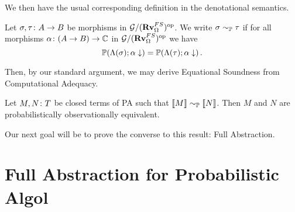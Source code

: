 \documentclass{report}[11pt]
\begin{document}
We then have the usual corresponding definition in the denotational semantics.

\begin{definition}
  Let $\sigma,\tau\colon A \to B$ be morphisms in $\mathcal G/({\normalfont\textbf{Rv}}_\Omega^{FS})^{\mathrm{op}}$.  
  We write $\sigma\sim_{\mathbb{P}}\tau$ if for all morphisms $\alpha \colon (A \to B) \to \mathbb{C}$ in $\mathcal G/({\normalfont\textbf{Rv}}_\Omega^{FS})^{\mathrm{op}}$ we have
  \[
    \mathbb{P}(\Lambda(\sigma);\alpha\downarrow) = \mathbb{P}(\Lambda(\tau);\alpha\downarrow)\,.
    \]
\end{definition}

Then, by our standard argument, we may derive Equational Soundness from Computational Adequacy.

\begin{proposition}
  Let $M,N\colon T$ be closed terms of PA such that $\left\llbracket M\right\rrbracket \sim_{\mathbb{P}} \left\llbracket N\right\rrbracket$.  
  Then $M$ and $N$ are probabilistically observationally equivalent.
\end{proposition}

Our next goal will be to prove the converse to this result: Full Abstraction.

\section{Full Abstraction for Probabilistic Algol}
\end{document}

